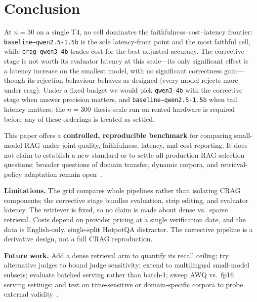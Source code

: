 
\section{Conclusion}
\label{sec:conclusion}

At $n=30$ on a single T4, no cell dominates the faithfulness--cost--latency
frontier: \texttt{baseline--qwen2.5-1.5b} is the sole latency-front point and
the most faithful cell, while \texttt{crag--qwen3-4b} trades cost for the best
adjusted accuracy. The corrective stage is not worth its evaluator latency at
this scale---its only significant effect is a latency increase on the smallest
model, with no significant correctness gain---though its rejection behaviour
behaves as designed (every model rejects more under crag). Under a fixed
budget we would pick \texttt{qwen3-4b} with the corrective stage when answer
precision matters, and \texttt{baseline--qwen2.5-1.5b} when tail latency
matters; the $n=300$ thesis-scale run on rented hardware is required before
any of these orderings is treated as settled.

This paper offers a \textbf{controlled, reproducible benchmark} for
comparing small-model RAG under joint quality, faithfulness, latency,
and cost reporting. It does not claim to establish a new standard or to
settle all production RAG selection questions; broader questions of
domain transfer, dynamic corpora, and retrieval-policy adaptation remain
open~\cite{brown2025systematic,wu2024survey,sharma2025survey,li2025biomedical}.

\textbf{Limitations.}
The grid compares whole pipelines rather than isolating CRAG
components; the corrective stage bundles evaluation, strip editing, and
evaluator latency. The retriever is fixed, so no claim is made about
dense vs.\ sparse retrieval. Costs depend on provider pricing at a
single verification date, and the data is English-only, single-split
HotpotQA distractor. The corrective pipeline is a derivative design, not
a full CRAG reproduction.

\textbf{Future work.}
Add a dense retrieval arm to quantify its recall ceiling; try
alternative judges to bound judge sensitivity; extend to multilingual
small-model subsets; evaluate batched serving rather than batch-1;
sweep AWQ vs.\ fp16 serving settings; and test on time-sensitive or
domain-specific corpora to probe external validity~\cite{zeng2025rare,li2025biomedical,almohaimeed2026arabic}.

